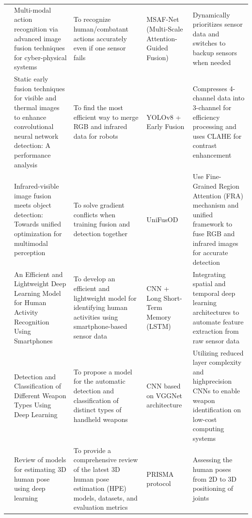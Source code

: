 \begin{longtable}{p{1.21cm} p{3cm} p{3cm} p{3cm} p{3cm}}
    \cite{supplementary_paper_3} &
    Multi-modal action recognition via advanced image fusion techniques for cyber-physical systems &
    To recognize human/combatant actions accurately even if one sensor fails &
    MSAF-Net (Multi-Scale Attention-Guided Fusion) &
    Dynamically prioritizes sensor data and switches to backup sensors when needed \\

    \cite{supplementary_paper_4} &
    Static early fusion techniques for visible and thermal images to enhance convolutional neural network detection: A performance analysis &
    To find the most efficient way to merge RGB and infrared data for robots &
    YOLOv8 + Early Fusion &
    Compresses 4-channel data into 3-channel for efficiency processing and uses CLAHE for contrast enhancement \\

    \cite{supplementary_paper_5} &
    Infrared-visible image fusion meets object detection: Towards unified optimization for multimodal perception &
    To solve gradient conflicts when training fusion and detection together &
    UniFusOD &
    Use Fine-Grained Region Attention (FRA) mechanism and unified framework to fuse RGB and infrared images for accurate detection \\

    \cite{supplementary_paper_6} &
    An Efficient and Lightweight Deep Learning Model for Human Activity Recognition Using Smartphones &
    To develop an efficient and lightweight model for identifying human activities using smartphone-based sensor data &
    CNN + Long Short-Term Memory (LSTM) &
    Integrating spatial and temporal deep learning architectures to automate feature extraction from raw sensor data \\

    \cite{supplementary_paper_7} &
    Detection and Classification of Different Weapon Types Using Deep Learning &
    To propose a model for the automatic detection and classification of distinct types of handheld weapons &
    CNN based on VGGNet architecture &
    Utilizing reduced layer complexity and highprecision CNNs to enable weapon identification on low-cost computing systems \\

    \cite{supplementary_paper_8} &
    Review of models for estimating 3D human pose using deep learning &
    To provide a comprehensive review of the latest 3D human pose estimation (HPE) models, datasets, and evaluation metrics &
    PRISMA protocol &
    Assessing the human poses from 2D to 3D positioning of joints \\


\end{longtable}
